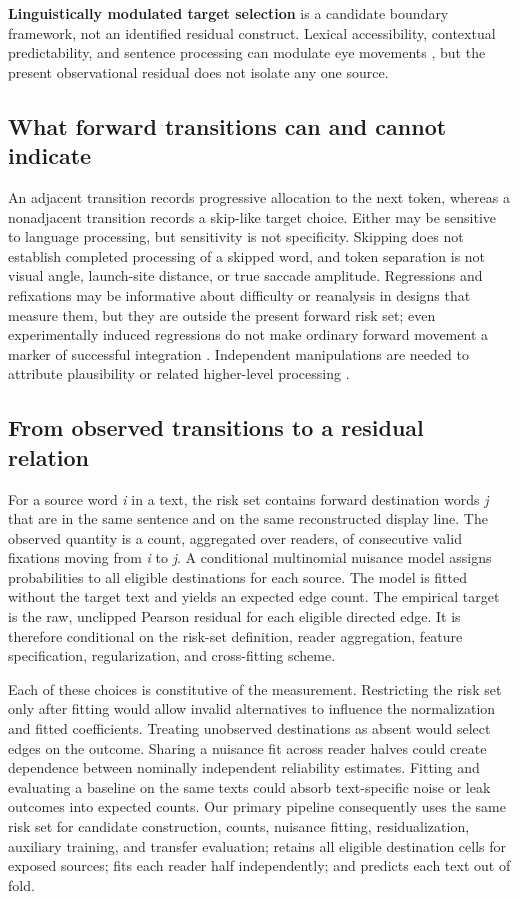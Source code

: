 \documentclass[11pt]{article}
\begin{document}
\textbf{Linguistically modulated target selection} is a candidate boundary framework, not an identified residual construct. Lexical accessibility, contextual predictability, and sentence processing can modulate eye movements \citep{kliegl2006,rayner2004frequency,clifton2007}, but the present observational residual does not isolate any one source.

\subsection{What forward transitions can and cannot indicate}

An adjacent transition records progressive allocation to the next token, whereas a nonadjacent transition records a skip-like target choice. Either may be sensitive to language processing, but sensitivity is not specificity. Skipping does not establish completed processing of a skipped word, and token separation is not visual angle, launch-site distance, or true saccade amplitude. Regressions and refixations may be informative about difficulty or reanalysis in designs that measure them, but they are outside the present forward risk set; even experimentally induced regressions do not make ordinary forward movement a marker of successful integration \citep{frazier1982,clifton2007}. Independent manipulations are needed to attribute plausibility or related higher-level processing \citep{rayner2004plausibility}.

\subsection{From observed transitions to a residual relation}

For a source word \emph{i} in a text, the risk set contains forward destination words \emph{j} that are in the same sentence and on the same reconstructed display line. The observed quantity is a count, aggregated over readers, of consecutive valid fixations moving from \emph{i} to \emph{j}. A conditional multinomial nuisance model assigns probabilities to all eligible destinations for each source. The model is fitted without the target text and yields an expected edge count. The empirical target is the raw, unclipped Pearson residual for each eligible directed edge. It is therefore conditional on the risk-set definition, reader aggregation, feature specification, regularization, and cross-fitting scheme.

Each of these choices is constitutive of the measurement. Restricting the risk set only after fitting would allow invalid alternatives to influence the normalization and fitted coefficients. Treating unobserved destinations as absent would select edges on the outcome. Sharing a nuisance fit across reader halves could create dependence between nominally independent reliability estimates. Fitting and evaluating a baseline on the same texts could absorb text-specific noise or leak outcomes into expected counts. Our primary pipeline consequently uses the same risk set for candidate construction, counts, nuisance fitting, residualization, auxiliary training, and transfer evaluation; retains all eligible destination cells for exposed sources; fits each reader half independently; and predicts each text out of fold.
\end{document}
